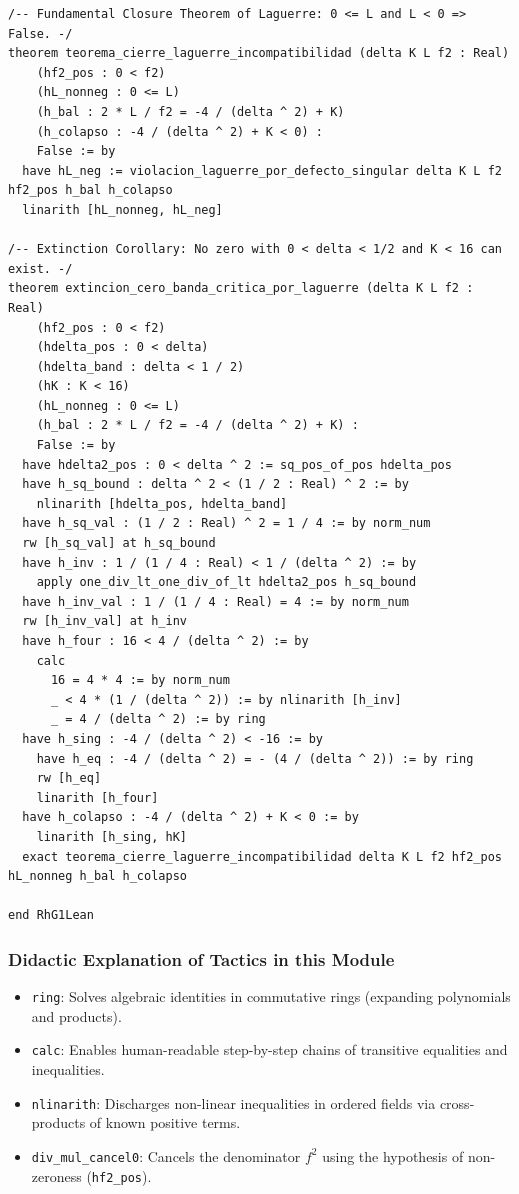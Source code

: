 \documentclass[11pt,a4paper]{article}
\theoremstyle{definition}
\theoremstyle{remark}
\begin{document}
\begin{lstlisting}[language=Lean4]
/-- Fundamental Closure Theorem of Laguerre: 0 <= L and L < 0 => False. -/
theorem teorema_cierre_laguerre_incompatibilidad (delta K L f2 : Real)
    (hf2_pos : 0 < f2)
    (hL_nonneg : 0 <= L)
    (h_bal : 2 * L / f2 = -4 / (delta ^ 2) + K)
    (h_colapso : -4 / (delta ^ 2) + K < 0) :
    False := by
  have hL_neg := violacion_laguerre_por_defecto_singular delta K L f2 hf2_pos h_bal h_colapso
  linarith [hL_nonneg, hL_neg]

/-- Extinction Corollary: No zero with 0 < delta < 1/2 and K < 16 can exist. -/
theorem extincion_cero_banda_critica_por_laguerre (delta K L f2 : Real)
    (hf2_pos : 0 < f2)
    (hdelta_pos : 0 < delta)
    (hdelta_band : delta < 1 / 2)
    (hK : K < 16)
    (hL_nonneg : 0 <= L)
    (h_bal : 2 * L / f2 = -4 / (delta ^ 2) + K) :
    False := by
  have hdelta2_pos : 0 < delta ^ 2 := sq_pos_of_pos hdelta_pos
  have h_sq_bound : delta ^ 2 < (1 / 2 : Real) ^ 2 := by
    nlinarith [hdelta_pos, hdelta_band]
  have h_sq_val : (1 / 2 : Real) ^ 2 = 1 / 4 := by norm_num
  rw [h_sq_val] at h_sq_bound
  have h_inv : 1 / (1 / 4 : Real) < 1 / (delta ^ 2) := by
    apply one_div_lt_one_div_of_lt hdelta2_pos h_sq_bound
  have h_inv_val : 1 / (1 / 4 : Real) = 4 := by norm_num
  rw [h_inv_val] at h_inv
  have h_four : 16 < 4 / (delta ^ 2) := by
    calc
      16 = 4 * 4 := by norm_num
      _ < 4 * (1 / (delta ^ 2)) := by nlinarith [h_inv]
      _ = 4 / (delta ^ 2) := by ring
  have h_sing : -4 / (delta ^ 2) < -16 := by
    have h_eq : -4 / (delta ^ 2) = - (4 / (delta ^ 2)) := by ring
    rw [h_eq]
    linarith [h_four]
  have h_colapso : -4 / (delta ^ 2) + K < 0 := by
    linarith [h_sing, hK]
  exact teorema_cierre_laguerre_incompatibilidad delta K L f2 hf2_pos hL_nonneg h_bal h_colapso

end RhG1Lean
\end{lstlisting}

\subsubsection*{Didactic Explanation of Tactics in this Module}
\begin{itemize}
    \item \texttt{ring}: Solves algebraic identities in commutative rings (expanding polynomials and products).
    \item \texttt{calc}: Enables human-readable step-by-step chains of transitive equalities and inequalities.
    \item \texttt{nlinarith}: Discharges non-linear inequalities in ordered fields via cross-products of known positive terms.
    \item \texttt{div\_mul\_cancel0}: Cancels the denominator $f^2$ using the hypothesis of non-zeroness (\texttt{hf2\_pos}).
\end{itemize}
\end{document}
